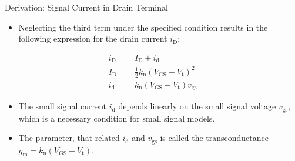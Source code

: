 \begin{frame}{Derivation: Signal Current in Drain Terminal}
    \begin{itemize}
        \item Neglecting the third term under the specified condition results in the following 
        expression for the drain current $i_{\mathrm{D}}$:
    \end{itemize}
    \begin{align*}
            i_{\mathrm{D}}&=I_{\mathrm{D}}+i_{\mathrm{d}} \\
            I_{\mathrm{D}}&=\frac{1}{2}k_{\mathrm{n}}(V_{\mathrm{GS}}-V_{\mathrm{t}})^{2} \\
            i_{\mathrm{d}}&=k_{\mathrm{n}}(V_{\mathrm{GS}}-V_{\mathrm{t}})v_{\mathrm{gs}}
    \end{align*}
    \begin{itemize}
        \item The small signal current $i_{\mathrm{d}}$ depends linearly on the small signal voltage
        $v_{\mathrm{gs}}$, which is a necessary condition for small signal models.
        \item The parameter, that related $i_{\mathrm{d}}$ and $v_{\mathrm{gs}}$ is called the 
        transconductance $g_{\mathrm{m}}=k_{\mathrm{n}}(V_{\mathrm{GS}}-V_{\mathrm{t}})$.
    \end{itemize} 
\end{frame}

